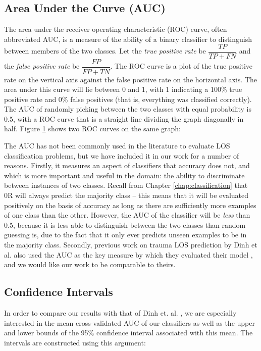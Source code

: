 \subsection{Area Under the Curve (AUC)}
The area under the receiver operating characteristic (ROC) curve, often
abbreviated AUC, is a measure of the ability of a binary classifier to
distinguish between members of the two classes. Let the \textit{true
positive rate} be $\dfrac{TP}{TP + FN}$ and the \textit{false positive rate}
be $\dfrac{FP}{FP + TN}$. The ROC curve is a plot of the true positive rate
on the vertical axis against the false positive rate on the horizontal axis.
The area under this curve will lie between 0 and 1, with 1 indicating a
100\% true positive rate and 0\% false positives (that is, everything was
classified correctly). The AUC of randomly picking between the two classes
with equal probability is 0.5, with a ROC curve that is a straight line
dividing the graph diagonally in half. Figure \ref{fig:sampleroc} shows
two ROC curves on the same graph:

\begin{figure}[h]
\label{fig:sampleroc}
\caption{}
\centering
\end{figure}

The AUC has not been commonly used in the literature to evaluate LOS
classification problems, but we have included it in our work for a number of
reasons. Firstly, it measures an aspect of classifiers that accuracy does not,
and which is more important and useful in the domain: the ability to
discriminate between instances of two classes. Recall from Chapter
\ref{chap:classification} that 0R will always predict the majority class --
this means that it will be evaluated positively on the basis of accuracy
as long as there are sufficiently more examples of one class than the other.
However, the AUC of the classifier will be \textit{less} than 0.5, because it
is less able to distinguish between the two classes than random guessing is,
due to the fact that it only ever predicts unseen examples to be in the
majority class. Secondly, previous work on trauma LOS prediction by Dinh et al.
also used the AUC as the key measure by which they evaluated their model
\cite{Dinh2013a}, and we would like our work to be comparable to theirs.

\subsection{Confidence Intervals}
In order to compare our results with that of Dinh et. al. \citep{Dinh2013a},
we are especially interested in the mean cross-validated AUC of our
classifiers as well as
the upper and lower bounds of the 95\% confidence interval associated with this
mean. The intervals are constructed using this argument:

